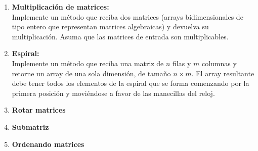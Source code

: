 \begin{enumerate}
    \item \textbf{Multiplicación de matrices:}\\
    Implemente un método que reciba dos matrices (arrays bidimensionales de tipo entero que representan matrices algebraicas) y devuelva su multiplicación. Asuma que las matrices de entrada son multiplicables.

    \item \textbf{Espiral:}\\
    Implemente un método que reciba una matriz de \(n\) filas y \(m\) columnas y retorne un array de una sola dimensión, de tamaño \(n \times m\). El array resultante debe tener todos los elementos de la espiral que se forma comenzando por la primera posición y moviéndose a favor de las manecillas del reloj.

    \item \textbf{Rotar matrices}\\
    

    \item \textbf{Submatriz}\\
    

    \item \textbf{Ordenando matrices}\\
    
\end{enumerate}

\newpage
